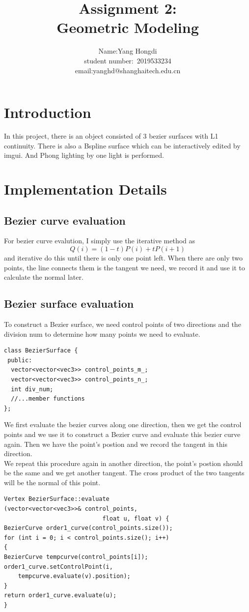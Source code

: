 \documentclass[acmtog]{acmart}
\title{Assignment 2:\\ {Geometric Modeling}}
\author{Name:\quad Yang Hongdi  \\ student number:\ 2019533234
\\email:\quad yanghd@shanghaitech.edu.cn}
\begin{document}
\maketitle

\vspace*{2 ex}

\section{Introduction}
In this project, there is an object consisted of 3 bezier surfaces with L1 continuity. There is also a 
Bspline surface which can be interactively edited by imgui. And Phong lighting by one light is performed.


\section{Implementation Details}
\subsection{Bezier curve evaluation}
For bezier curve evalution, I simply use the iterative method as $$Q(i) = (1-t) P(i) + tP(i+1)$$
and iterative do this until there is only one point left. When there are only two points, the line connects them is the tangent we need, we record it
and use it to calculate the normal later.

\subsection{Bezier surface evaluation}
To construct a Bezier surface, we need control points of two directions and the division num to determine how many points we need to evaluate.
\begin{lstlisting}
class BezierSurface {
 public:
  vector<vector<vec3>> control_points_m_;
  vector<vector<vec3>> control_points_n_;
  int div_num;
  //...member functions
};
\end{lstlisting}
\quad We first evaluate the bezier curves along one direction, then we get the control points and we use it to construct a Bezier curve and evaluate this bezier curve again.
Then we have the point's postion and we record the tangent in this direction.\\
We repeat this procedure again in another direction, the point's postion should be the same and we get another tangent. The cross product of the two tangents will be the
normal of this point.
\begin{lstlisting}
Vertex BezierSurface::evaluate
(vector<vector<vec3>>& control_points,
							float u, float v) {
BezierCurve order1_curve(control_points.size());
for (int i = 0; i < control_points.size(); i++)
{
BezierCurve tempcurve(control_points[i]);
order1_curve.setControlPoint(i, 
	tempcurve.evaluate(v).position);
}
return order1_curve.evaluate(u);                              
}
\end{lstlisting}
\end{document}
